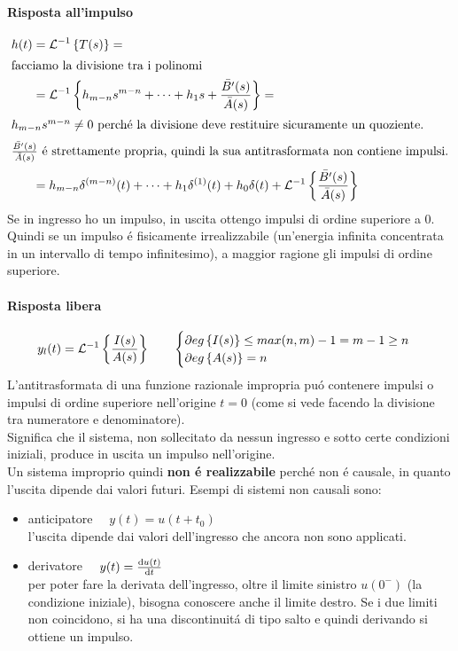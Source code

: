 \documentclass[../main.tex]{subfiles}
\begin{document}
		\paragraph{Risposta all'impulso}
			\begin{align*}
				h(t) &= \mathcal{L}^{-1} \left\lbrace T(s) \right\rbrace =
				\\
				\intertext{facciamo la divisione tra i polinomi}
				&= \mathcal{L}^{-1} \left\lbrace h_{m-n}s^{m-n} + \dots + h_1s + \frac{\bar{B'}(s)}{\bar{A}(s)} \right\rbrace =
				\\
				\intertext{$ h_{m-n}s^{m-n} \neq 0 $ perch\'{e} la divisione deve restituire sicuramente un quoziente.}
				\intertext{$ \frac{\bar{B'}(s)}{\bar{A}(s)} $ \'{e} strettamente propria, quindi la sua antitrasformata non contiene impulsi.}
				&= h_{m-n} \delta^{(m-n)}(t) + \dots + h_1 \delta^{(1)}(t) + h_0 \delta(t) + \mathcal{L}^{-1} \left\lbrace \frac{\bar{B'}(s)}{\bar{A}(s)} \right\rbrace
			\end{align*}
			Se in ingresso ho un impulso, in uscita ottengo impulsi di ordine superiore a 0. Quindi se un impulso \'{e} fisicamente irrealizzabile (un'energia infinita concentrata in un intervallo di tempo infinitesimo), a maggior ragione gli impulsi di ordine superiore.
		\paragraph{Risposta libera}
			\[
				y_l(t) = \mathcal{L}^{-1} \left\lbrace \frac{I(s)}{A(s)} \right\rbrace \qquad
				\begin{cases}
					\partial eg \left\lbrace I(s) \right\rbrace \leq max(n,m)-1 = m-1 \geq n
					\\
					\partial eg \left\lbrace A(s) \right\rbrace = n
				\end{cases}
			\]
			L'antitrasformata di una funzione razionale impropria pu\'{o} contenere impulsi o impulsi di ordine superiore nell'origine $ t = 0 $ (come si vede facendo la divisione tra numeratore e denominatore).\\
			Significa che il sistema, non sollecitato da nessun ingresso e sotto certe condizioni iniziali, produce in uscita un impulso nell'origine.\\
			Un sistema improprio quindi \textbf{non \'{e} realizzabile} perch\'{e} non \'{e} causale, in quanto l'uscita dipende dai valori futuri.
			Esempi di sistemi non causali sono:
			\begin{itemize}
				\item 
					anticipatore $\quad y(t) = u(t+t_0) $\\
					l'uscita dipende dai valori dell'ingresso che ancora non sono applicati.
				\item 
					derivatore $\quad y(t) = \frac{\mathrm{d} u(t)}{\mathrm{d} t} $\\
					per poter fare la derivata dell'ingresso, oltre il limite sinistro $ u(0^-) $ (la condizione iniziale), bisogna conoscere anche il limite destro. Se i due limiti non coincidono, si ha una discontinuit\'{a} di tipo salto e quindi derivando si ottiene un impulso.
			\end{itemize}
\end{document}
